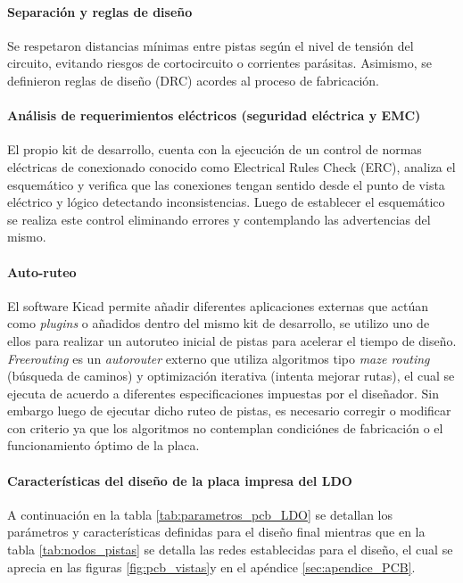 \documentclass[]{article}
\begin{document}
	
	\paragraph{Separación y reglas de diseño}
	Se respetaron distancias mínimas entre pistas según el nivel de tensión del circuito, evitando riesgos de cortocircuito o corrientes parásitas. Asimismo, se definieron reglas de diseño (DRC) acordes al proceso de fabricación.
	
	\paragraph{Análisis de requerimientos eléctricos (seguridad eléctrica y EMC)}
	
	El propio kit de desarrollo, cuenta con la ejecución de un control de normas eléctricas de conexionado conocido como Electrical Rules Check (ERC), analiza el esquemático y verifica que las conexiones tengan sentido desde el punto de vista eléctrico y lógico detectando inconsistencias. Luego de establecer el esquemático se realiza este control eliminando errores y contemplando las advertencias del mismo.
	
	\paragraph{Auto-ruteo}
	
	El software Kicad permite añadir diferentes aplicaciones externas que actúan como \textit{plugins} o añadidos dentro del mismo kit de desarrollo, se utilizo uno de ellos para realizar un autoruteo inicial de pistas para acelerar el tiempo de diseño. \textit{Freerouting} es un \textit{autorouter} externo que utiliza algoritmos tipo \textit{maze routing} (búsqueda de caminos) y optimización iterativa (intenta mejorar rutas), el cual se ejecuta de acuerdo a diferentes especificaciones impuestas por el diseñador. Sin embargo luego de ejecutar dicho ruteo de pistas, es necesario corregir o modificar con criterio ya que los algoritmos no contemplan condiciónes de fabricación o el funcionamiento óptimo de la placa.
	
	
	\paragraph{Características del diseño de la placa impresa del LDO}
	
	A continuación en la tabla \ref{tab:parametros_pcb_LDO} se detallan los parámetros y características definidas para el diseño final mientras que en la tabla \ref{tab:nodos_pistas} se detalla las redes establecidas para el diseño, el cual se aprecia en las figuras \ref{fig:pcb_vistas}y en el apéndice \ref{sec:apendice_PCB}.
	
\end{document}
